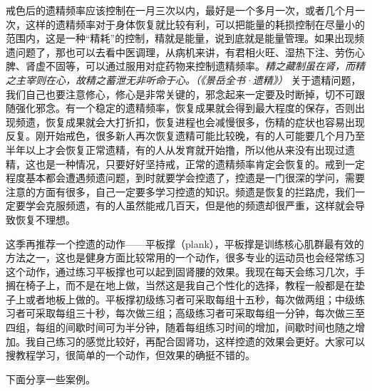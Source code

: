 戒色后的遗精频率应该控制在一月三次以内，最好是一个多月一次，或者几个月一次，这样的遗精频率对于身体恢复就比较有利，可以把能量的耗损控制在尽量小的范围内，这是一种“精耗”的控制，精就是能量，说到底就是能量管理。如果出现频遗问题了，那也可以去看中医调理，从病机来讲，有君相火旺、湿热下注、劳伤心脾、肾虚不固等，可以通过服用对症药物来控制遗精频率。\textit{精之藏制虽在肾，而精之主宰则在心，故精之蓄泄无非听命于心。（《景岳全书·遗精》）} 关于遗精问题，我们自己也要注意修心，修心是非常关键的，邪念起来一定要及时断掉，切不可跟随强化邪念。有一个稳定的遗精频率，恢复成果就会得到最大程度的保存，否则出现频遗，恢复成果就会大打折扣，恢复进程也会减慢很多，伤精的症状也容易出现反复。刚开始戒色，很多新人再次恢复遗精可能比较晚，有的人可能要几个月乃至半年以上才会恢复正常遗精，有的人从发育就开始撸，所以他从来没有出现过遗精，这也是一种情况，只要好好坚持戒，正常的遗精频率肯定会恢复的。戒到一定程度基本都会遭遇频遗问题，到时就要学会控遗了，控遗是一门很深的学问，需要注意的方面有很多，自己一定要多学习控遗的知识。频遗是恢复的拦路虎，我们一定要学会克服频遗，有的人虽然能戒几百天，但是他的频遗却很严重，这样就会导致恢复不理想。

这季再推荐一个控遗的动作——平板撑（plank），平板撑是训练核心肌群最有效的方法之一，这也是健身方面比较常用的一个动作，很多专业的运动员也会经常练习这个动作，通过练习平板撑也可以起到固肾腰的效果。我现在每天会练习几次，手搁在椅子上，而不是在地上做，当然这是我自己个性化的选择，教程一般都是在垫子上或者地板上做的。平板撑初级练习者可采取每组十五秒，每次做两组；中级练习者可采取每组三十秒，每次做三组；高级练习者可采取每组一分钟，每次做三至四组，每组的间歇时间可为半分钟，随着每组练习时间的增加，间歇时间也随之增加。我自己练习的感觉比较好，再配合固肾功，这样控遗的效果会更好。大家可以搜教程学习，很简单的一个动作，但效果的确挺不错的。

下面分享一些案例。


